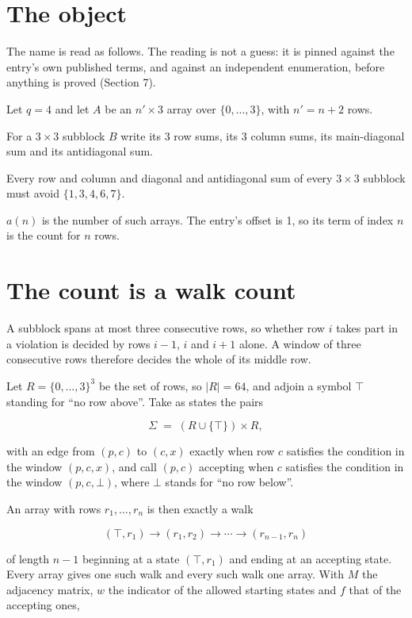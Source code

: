 \documentclass[11pt]{article}
\theoremstyle{definition}
\begin{document}
\section{The object}

The name is read as follows. The reading is not a guess: it is pinned against the entry's own published terms, and against an independent enumeration, before anything is proved (Section 7).

Let $q = 4$ and let $A$ be an $n' \times 3$ array over $\{0,\dots,3\}$, with $n' = n + 2$ rows.

For a $3\times3$ subblock $B$ write its 3 row sums, its 3 column sums, its main-diagonal sum and its antidiagonal sum.

Every row and column and diagonal and antidiagonal sum of every $3\times3$ subblock must avoid $\{1, 3, 4, 6, 7\}$.

$a(n)$ is the number of such arrays. The entry's offset is 1, so its term of index $n$ is the count for $n$ rows.

\section{The count is a walk count}

A subblock spans at most three consecutive rows, so whether row $i$ takes part in a violation is decided by rows $i-1$, $i$ and $i+1$ alone. A window of three consecutive rows therefore decides the whole of its middle row.

Let $R = \{0,\dots,3\}^{3}$ be the set of rows, so $|R| = 64$, and adjoin a symbol $\top$ standing for ``no row above''. Take as states the pairs

\[\Sigma \;=\; (R \cup \{\top\}) \times R,\]

with an edge from $(p,c)$ to $(c,x)$ exactly when row $c$ satisfies the condition in the window $(p,c,x)$, and call $(p,c)$ accepting when $c$ satisfies the condition in the window $(p,c,\bot)$, where $\bot$ stands for ``no row below''.

An array with rows $r_1,\dots,r_n$ is then exactly a walk

\[(\top,r_1) \to (r_1,r_2) \to \cdots \to (r_{n-1},r_n)\]

of length $n-1$ beginning at a state $(\top,r_1)$ and ending at an accepting state. Every array gives one such walk and every such walk one array. With $M$ the adjacency matrix, $w$ the indicator of the allowed starting states and $f$ that of the accepting ones,
\end{document}
